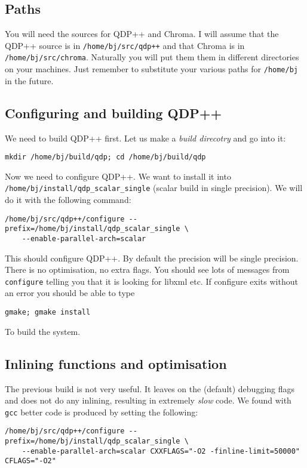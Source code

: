 \documentclass{article}
\begin{document}
\subsection{Paths}
You will need the sources for QDP++ and Chroma. I will assume that the
QDP++ source is in {\tt /home/bj/src/qdp++} and that Chroma is in {\tt
/home/bj/src/chroma}. Naturally you will put them them in different
directories on your machines. Just remember to substitute your various
paths for {\tt /home/bj} in the future.

\subsection{Configuring and building QDP++}
We need to build QDP++ first. Let us make a {\em build direcotry} and 
go into it:

\hbox{\tt mkdir /home/bj/build/qdp; cd /home/bj/build/qdp}

Now we need to configure QDP++. We want to install it into {\tt /home/bj/install/qdp\_scalar\_single} (scalar build in single precision). We will do it 
with the following command:

\begin{verbatim}
/home/bj/src/qdp++/configure --prefix=/home/bj/install/qdp_scalar_single \
    --enable-parallel-arch=scalar
\end{verbatim}

This should configure QDP++. By default the precision will be single precision.
There is no optimisation, no extra flags. You should see lots of messages from 
{\tt configure} telling you that it is looking for libxml etc. If configure
exits without an error you should be able to type

\begin{verbatim}
gmake; gmake install
\end{verbatim}

To build the system.

\subsection{Inlining functions and optimisation}
The previous build is not very useful. It leaves on the (default) debugging 
flags and does not do any inlining, resulting in extremely {\em slow} code.
We found with {\tt gcc} better code is produced by setting the following:

\begin{verbatim}
/home/bj/src/qdp++/configure --prefix=/home/bj/install/qdp_scalar_single \
    --enable-parallel-arch=scalar CXXFLAGS="-O2 -finline-limit=50000" CFLAGS="-O2"
\end{verbatim}
\end{document}
